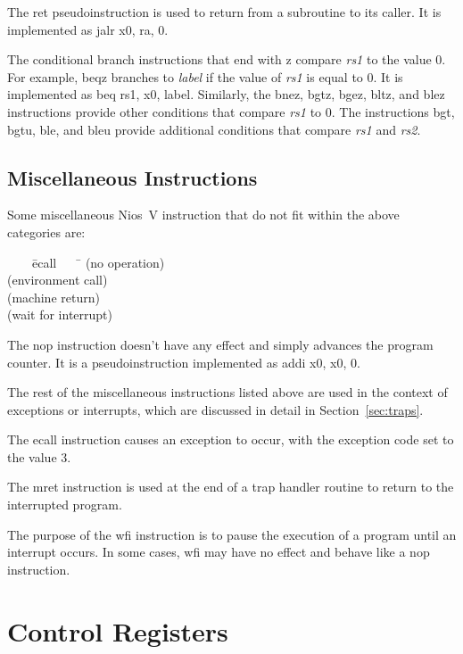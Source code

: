 \documentclass[11pt, twoside, pdftex]{article}
\newenvironment{ctabbing}%
{\begin{center}\begin{minipage}{\textwidth}\begin{tabbing}}
{\end{tabbing}\end{minipage}\end{center}}
\begin{document}
The {\sf ret} pseudoinstruction is used to return from a subroutine to its caller. It is
implemented as {\sf jalr x0, ra, 0}.

The conditional branch instructions that end with {\sf z} compare {\it rs1} to the value 0.
For example, {\sf beqz} branches to {\it label} if the value of {\it rs1} is equal to 0. 
It is implemented as {\sf beq rs1, x0, label}. Similarly, the {\sf bnez}, {\sf bgtz},
{\sf bgez}, {\sf bltz}, and {\sf blez} instructions provide other conditions that 
compare {\it rs1} to 0.
The instructions {\sf bgt}, {\sf bgtu}, {\sf ble}, and {\sf bleu} provide additional 
conditions that compare {\it rs1} and {\it rs2}. 

\subsection{Miscellaneous Instructions}
\label{sec:misc}

Some miscellaneous Nios~V instruction that do not fit within the above categories are:
\begin{ctabbing}
~~~~\={\sf ecall}~~~~\=\kill
{} \>(no operation)\\
 \>(environment call)\\
 \>(machine return)\\
 \>(wait for interrupt)\\
\end{ctabbing}
\vspace{-\baselineskip}
The {\sf nop} instruction doesn't have any effect and simply advances the program counter. 
It is a pseudoinstruction implemented as {\sf addi x0, x0, 0}.

The rest of the  miscellaneous instructions listed above
are used in the context of exceptions or interrupts,
which are discussed in detail in Section~\ref{sec:traps}. 

The {\sf ecall} instruction causes an exception to occur, with the exception code set to 
the value 3.

The {\sf mret} instruction is used at the end of a trap handler routine to return to the 
interrupted program.  

The purpose of the {\sf wfi} instruction is to pause the execution of a program until 
an interrupt occurs. In some cases, {\sf wfi} may have no effect and behave like a 
{\sf nop} instruction.

\section{Control Registers}
\label{sec:control}
\end{document}
